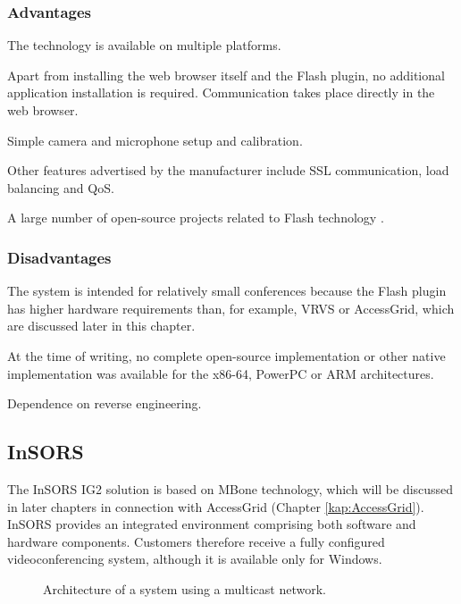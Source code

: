 \subsubsection*{Advantages}
\begin{paklist}
\item The technology is available on multiple platforms.
\item Apart from installing the web browser itself and the Flash plugin, no additional application installation is required. Communication takes place directly in the web browser.
\item Simple camera and microphone setup and calibration.
\item Other features advertised by the manufacturer include SSL communication, load balancing and QoS.
\item A large number of open-source projects related to Flash technology \cite{OpenSourceFlash-AllProjects}.
\end{paklist}

\subsubsection*{Disadvantages}
\begin{paklist}
\item The system is intended for relatively small conferences because the Flash plugin has higher hardware requirements than, for example, VRVS or AccessGrid, which are discussed later in this chapter.
\item At the time of writing, no complete open-source implementation or other native implementation was available for the x86-64, PowerPC or ARM architectures.
\item Dependence on reverse engineering.
\end{paklist}

\subsection{InSORS}\label{kap:InSORS}
The InSORS IG2 solution is based on MBone technology, which will be discussed in later chapters in connection with AccessGrid (Chapter \ref{kap:AccessGrid}). InSORS provides an integrated environment comprising both software and hardware components. Customers therefore receive a fully configured videoconferencing system, although it is available only for Windows.

\begin{figure}[htp]
\centering

\caption{Architecture of a system using a multicast network.}
\label{fig:ArchMulticast}
\end{figure}

